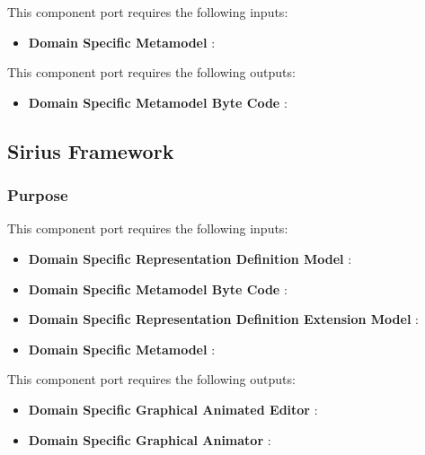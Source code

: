 \documentclass{gemoc} %
\begin{document}
This component port requires the following inputs:
\begin{itemize}
  \item \textbf{Domain Specific Metamodel} :
\end{itemize}

This component port requires the following outputs:
\begin{itemize}
  \item \textbf{Domain Specific Metamodel Byte Code} :
\end{itemize}

\subsection{Sirius Framework}


\subsubsection{Purpose}

This component port requires the following inputs:
\begin{itemize}
  \item \textbf{Domain Specific  Representation Definition Model} :
  \item \textbf{Domain Specific Metamodel Byte Code} :
  \item \textbf{Domain Specific Representation Definition Extension Model} :
  \item \textbf{Domain Specific Metamodel} :
\end{itemize}

This component port requires the following outputs:
\begin{itemize}
  \item \textbf{Domain Specific Graphical Animated Editor} :
  \item \textbf{Domain Specific Graphical Animator} :
\end{itemize}
\end{document}
